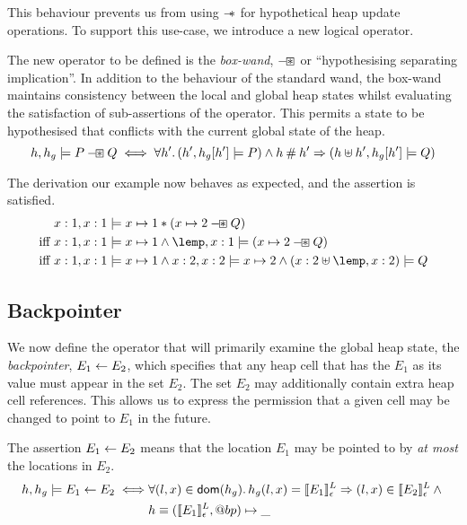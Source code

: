 \documentclass[a4paper,notitlepage]{report}
\begin{document}
This behaviour prevents us from using $\mathbin{-\mkern-6mu *}$ for hypothetical heap update
operations. To support this use-case, we introduce a new logical operator.

The new operator to be defined is the \emph{box-wand}, $\mathbin{-\mkern-3mu \boxast}$ or
``hypothesising separating implication''. In addition
to the behaviour of the standard wand, the box-wand maintains consistency
between the local and global heap states whilst evaluating the satisfaction of
sub-assertions of the operator. This permits a state to be hypothesised that
conflicts with the current global state of the heap.
\[
  h,h_g \models P \mathbin{-\mkern-3mu \boxast} Q \iff \forall h' \mathpunct{.} (h',h_g[h'] \models P)
  \land h \mathbin{\#} h' \Rightarrow (h \uplus h', h_g[h'] \models Q)
\]

The derivation our example now behaves as expected, and the assertion is
satisfied.
\begin{align*}
           & x:1,x:1 \satisfies x \pointsto 1 \sep (x \pointsto 2 \boxwand Q) \\
\text{iff } & x:1,x:1 \satisfies x \pointsto 1 \land \lemp,x:1 \satisfies (x \pointsto 2 \boxwand Q) \\
\text{iff } & x:1,x:1 \satisfies x \pointsto 1 \land x:2,x:2 \satisfies x \pointsto 2 \land (x:2 \disju \lemp,x:2) \satisfies Q
\end{align*}


\subsection{Backpointer}
\label{sec:backpointers}
We now define the operator that will primarily examine the global heap state,
the \emph{backpointer}, $E_1 \leftarrow E_2$, which specifies that any heap cell that
has the $E_1$ as its value must appear in the set $E_2$. The set $E_2$ may
additionally contain extra heap cell references. This allows us to express the
permission that a given cell may be changed to point to $E_1$ in the future.

The assertion $E_1 \leftarrow E_2$ means that the location $E_1$ may be pointed to by
\emph{at most} the locations in $E_2$.
\begin{align*}
  h, h_g \models E_1 \leftarrow E_2 \iff &
    \forall (l,x) \in \mathsf{dom}(h_g) \mathpunct{.} h_g(l,x) = \llbracket E_1 \rrbracket^L_\epsilon
    \Rightarrow (l,x) \in \llbracket E_2 \rrbracket^L_\epsilon \land {} \\
    & h \equiv (\llbracket E_1 \rrbracket^L_\epsilon, @bp) \mapsto \_
\end{align*}
\end{document}
